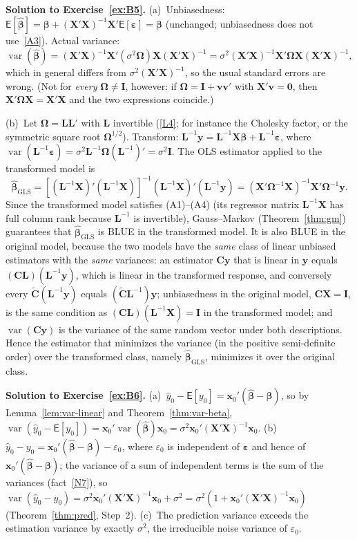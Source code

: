 \documentclass[12pt,a4paper]{article}
\theoremstyle{definition}
\newcommand\expc{\mathsf{E}}
\DeclareMathOperator\var{var}
\newcommand{\bX}{\mathbf{X}}
\newcommand{\by}{\mathbf{y}}
\newcommand{\bx}{\mathbf{x}}
\def\bb{\boldsymbol{\beta}}
\newcommand{\be}{\boldsymbol{\varepsilon}}
\newcommand{\bI}{\mathbf{I}}
\newcommand{\bzero}{\mathbf{0}}
\newcommand{\bC}{\mathbf{C}}
\newcommand{\bv}{\mathbf{v}}
\begin{document}
\textbf{Solution to Exercise~\ref{ex:B5}.} (a)~Unbiasedness: $\expc[\hat{\bb}] = \bb + (\bX'\bX)^{-1}\bX'\expc[\be] = \bb$ (unchanged; unbiasedness does not use~\ref{A3}). Actual variance:
\[
\var(\hat{\bb}) = (\bX'\bX)^{-1}\bX'(\sigma^2\boldsymbol\Omega)\bX(\bX'\bX)^{-1} = \sigma^2(\bX'\bX)^{-1}\bX'\boldsymbol\Omega\bX(\bX'\bX)^{-1},
\]
which in general differs from $\sigma^2(\bX'\bX)^{-1}$, so the usual standard errors are wrong. (Not for \emph{every} $\boldsymbol\Omega \neq \bI$, however: if $\boldsymbol\Omega = \bI + \bv\bv'$ with $\bX'\bv = \bzero$, then $\bX'\boldsymbol\Omega\bX = \bX'\bX$ and the two expressions coincide.)

(b)~Let $\boldsymbol\Omega = \mathbf{L}\mathbf{L}'$ with $\mathbf{L}$ invertible (\ref{L4}; for instance the Cholesky factor, or the symmetric square root $\boldsymbol\Omega^{1/2}$). Transform: $\mathbf{L}^{-1}\by = \mathbf{L}^{-1}\bX\bb + \mathbf{L}^{-1}\be$, where $\var(\mathbf{L}^{-1}\be) = \sigma^2\mathbf{L}^{-1}\boldsymbol\Omega(\mathbf{L}^{-1})' = \sigma^2\bI$. The OLS estimator applied to the transformed model is
\[
\hat{\bb}_{\mathrm{GLS}} = [(\mathbf{L}^{-1}\bX)'(\mathbf{L}^{-1}\bX)]^{-1}(\mathbf{L}^{-1}\bX)'(\mathbf{L}^{-1}\by) = (\bX'\boldsymbol\Omega^{-1}\bX)^{-1}\bX'\boldsymbol\Omega^{-1}\by.
\]
Since the transformed model satisfies (A1)--(A4) (its regressor matrix $\mathbf{L}^{-1}\bX$ has full column rank because $\mathbf{L}^{-1}$ is invertible), Gauss--Markov (Theorem~\ref{thm:gm}) guarantees that $\hat{\bb}_{\mathrm{GLS}}$ is BLUE in the transformed model. It is also BLUE in the original model, because the two models have the \emph{same} class of linear unbiased estimators with the \emph{same} variances: an estimator $\bC\by$ that is linear in $\by$ equals $(\bC\mathbf{L})(\mathbf{L}^{-1}\by)$, which is linear in the transformed response, and conversely every $\tilde{\bC}(\mathbf{L}^{-1}\by)$ equals $(\tilde{\bC}\mathbf{L}^{-1})\by$; unbiasedness in the original model, $\bC\bX = \bI$, is the same condition as $(\bC\mathbf{L})(\mathbf{L}^{-1}\bX) = \bI$ in the transformed model; and $\var(\bC\by)$ is the variance of the same random vector under both descriptions. Hence the estimator that minimizes the variance (in the positive semi-definite order) over the transformed class, namely $\hat{\bb}_{\mathrm{GLS}}$, minimizes it over the original class.

\textbf{Solution to Exercise~\ref{ex:B6}.} (a)~$\hat{y}_0 - \expc[y_0] = \bx_0'(\hat{\bb} - \bb)$, so by Lemma~\ref{lem:var-linear} and Theorem~\ref{thm:var-beta}, $\var(\hat{y}_0 - \expc[y_0]) = \bx_0'\var(\hat{\bb})\bx_0 = \sigma^2\bx_0'(\bX'\bX)^{-1}\bx_0$. (b)~$\hat{y}_0 - y_0 = \bx_0'(\hat{\bb} - \bb) - \varepsilon_0$, where $\varepsilon_0$ is independent of $\be$ and hence of $\bx_0'(\hat{\bb} - \bb)$; the variance of a sum of independent terms is the sum of the variances (fact~\ref{N7}), so $\var(\hat{y}_0 - y_0) = \sigma^2\bx_0'(\bX'\bX)^{-1}\bx_0 + \sigma^2 = \sigma^2(1 + \bx_0'(\bX'\bX)^{-1}\bx_0)$ (Theorem~\ref{thm:pred}, Step~2). (c)~The prediction variance exceeds the estimation variance by exactly $\sigma^2$, the irreducible noise variance of $\varepsilon_0$.
\end{document}
